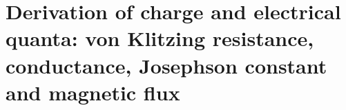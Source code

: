 \HMTFlushCurrentChapter
\chapter{Derivation of charge and electrical quanta: von Klitzing resistance, conductance, Josephson constant and magnetic flux}%
\begingroup
\renewcommand{\chapter}[2][]{}%
%
\endgroup

\HMTFlushCurrentChapter
\chapter{Quadratic characters and spectral constants: Catalan, Apéry, Euler--Mascheroni and the Stieltjes hierarchy}%
\begingroup
\renewcommand{\chapter}[2][]{}%
%
\endgroup

\HMTFlushCurrentChapter
\chapter{Euler--Kronecker constants and prime distributions: dodecaphasic characters, Meissel--Mertens and twin-prime series}%
\begingroup
\renewcommand{\chapter}[2][]{}%
%
\endgroup

\HMTFlushCurrentChapter
\chapter{Bendersky--Glaisher--Kinkelin family: regular products, derivatives of the zeta function and normalization hierarchies}%
\begingroup
\renewcommand{\chapter}[2][]{}%
%
\endgroup

\HMTFlushCurrentChapter
